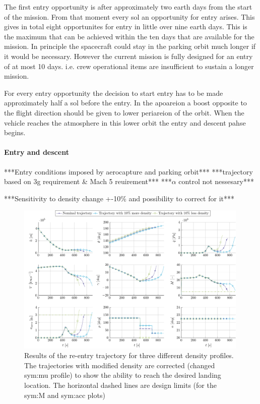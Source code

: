 The first entry opportunity is after approximately two earth days from the start of the mission. From that moment every sol an opportunity for entry arises. This gives in total eight opportunites for entry in little over nine earth days. This is the maximum that can be achieved within the ten days that are available for the mission. In principle the spacecraft could stay in the parking orbit much longer if it would be necessary. However the current mission is fully designed for an entry of at most 10 days. i.e. crew operational items are insufficient to sustain a longer mission.

For every entry opportunity the decision to start entry has to be made approximately half a sol before the entry. In the apoareion a boost opposite to the flight direction should be given to lower periareion of the orbit.  When the vehicle reaches the atmosphere in this lower orbit the entry and descent pahse begins. 

\paragraph{Entry and descent}
***Entry conditions imposed by aerocapture and parking orbit***
***trajectory based on 3g requirement \& Mach 5 reuirement***
***$\alpha$ control not nessesary***

***Sensitivity to density change +-10\% and possibility to correct for it***\\
\begin{figure}
	\centering
	\includegraphics[width=0.99\textwidth]{Figure/Orbit/sensitivity_entry.pdf}
	\caption{Results of the re-entry trajectory for three different density profiles. The trajectories with modified density are corrected (changed \gls{sym:mu} profile) to show the ability to reach the desired landing location. The horizontal dashed lines are design limits (for the \gls{sym:M} and \gls{sym:acc} plots)}
	\label{fig:orbit_entry_data}
\end{figure}

